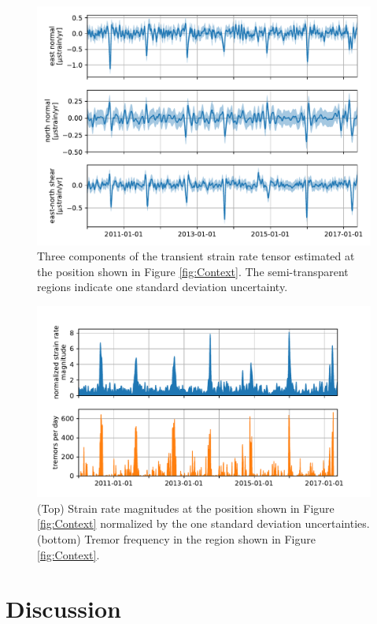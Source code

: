 \documentclass[10pt,letter]{article}
\begin{document}
\begin{figure}
\includegraphics{figures/strain_ts/strain-ts.pdf}
\caption{Three components of the transient strain rate tensor estimated at the position shown in Figure \ref{fig:Context}. The semi-transparent regions indicate one standard deviation uncertainty.}   
\label{fig:StrainTs}
\end{figure}

\begin{figure}
\includegraphics{figures/strain_ts/mag-ts.pdf}
\caption{(Top) Strain rate magnitudes at the position shown in Figure \ref{fig:Context} normalized by the one standard deviation uncertainties. (bottom) Tremor frequency in the region shown in Figure \ref{fig:Context}.}   
\label{fig:StrainMag}
\end{figure}


\section{Discussion}\label{sec:Discussion}
\end{document}
